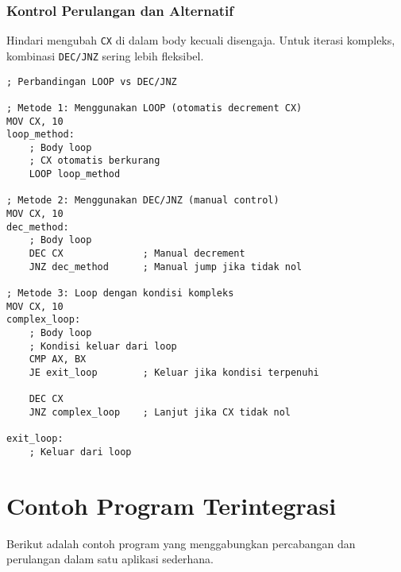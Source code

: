 \documentclass[../main.tex]{subfiles}
\begin{document}
            \subsubsection{Kontrol Perulangan dan Alternatif}
Hindari mengubah \texttt{CX} di dalam body kecuali disengaja. Untuk iterasi kompleks, kombinasi \texttt{DEC/JNZ} sering lebih fleksibel.

\begin{lstlisting}[language={[x86masm]Assembler}, caption=Perbandingan LOOP vs DEC/JNZ, label={lst:loop-vs-dec-jnz}]
; Perbandingan LOOP vs DEC/JNZ

; Metode 1: Menggunakan LOOP (otomatis decrement CX)
MOV CX, 10
loop_method:
    ; Body loop
    ; CX otomatis berkurang
    LOOP loop_method

; Metode 2: Menggunakan DEC/JNZ (manual control)
MOV CX, 10
dec_method:
    ; Body loop
    DEC CX              ; Manual decrement
    JNZ dec_method      ; Manual jump jika tidak nol

; Metode 3: Loop dengan kondisi kompleks
MOV CX, 10
complex_loop:
    ; Body loop
    ; Kondisi keluar dari loop
    CMP AX, BX
    JE exit_loop        ; Keluar jika kondisi terpenuhi
    
    DEC CX
    JNZ complex_loop    ; Lanjut jika CX tidak nol
    
exit_loop:
    ; Keluar dari loop
\end{lstlisting}

        \section{Contoh Program Terintegrasi}
            Berikut adalah contoh program yang menggabungkan percabangan dan perulangan dalam satu aplikasi sederhana.
\end{document}
